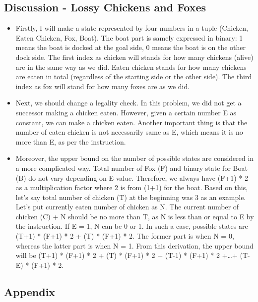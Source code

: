 \documentclass[]{article}
\providecommand{\tightlist}{%
  \setlength{\itemsep}{0pt}\setlength{\parskip}{0pt}}
\begin{document}
\subsection{Discussion - Lossy Chickens and
Foxes}\label{discussion---lossy-chickens-and-foxes}

\begin{itemize}
\tightlist
\item
  Firstly, I will make a state represented by four numbers in a tuple
  (Chicken, Eaten Chicken, Fox, Boat). The boat part is samely expressed
  in binary: 1 means the boat is docked at the goal side, 0 means the
  boat is on the other dock side. The first index as chicken will stands
  for how many chickens (alive) are in the same way as we did. Eaten
  chicken stands for how many chickens are eaten in total (regardless of
  the starting side or the other side). The third index as fox will
  stand for how many foxes are as we did.
\item
  Next, we should change a legality check. In this problem, we did not
  get a successor making a chicken eaten. However, given a certain
  number E as constant, we can make a chicken eaten. Another important
  thing is that the number of eaten chicken is not necessarily same as
  E, which means it is no more than E, as per the instruction.
\item
  Moreover, the upper bound on the number of possible states are
  considered in a more complicated way. Total number of Fox (F) and
  binary state for Boat (B) do not vary depending on E value. Therefore,
  we always have (F+1) * 2 as a multiplication factor where 2 is from
  (1+1) for the boat. Based on this, let's say total number of chicken
  (T) at the beginning was 3 as an example. Let's put currently eaten
  number of chicken as N. The current number of chicken (C) + N should
  be no more than T, as N is less than or equal to E by the instruction.
  If E = 1, N can be 0 or 1. In such a case, possible states are (T+1) *
  (F+1) * 2 + (T) * (F+1) * 2. The former part is when N = 0, whereas
  the latter part is when N = 1. From this derivation, the upper bound
  will be (T+1) * (F+1) * 2 + (T) * (F+1) * 2 + (T-1) * (F+1) * 2
  +\ldots{}+ (T-E) * (F+1) * 2.
\end{itemize}

\subsection{Appendix}\label{appendix}
\end{document}
